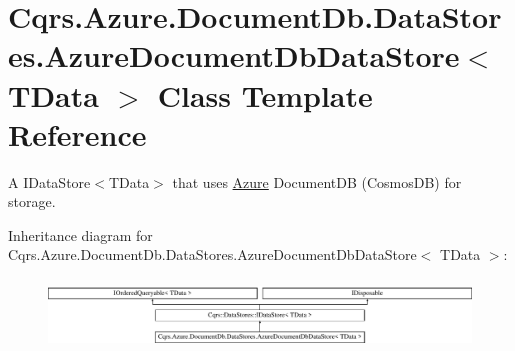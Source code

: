 \hypertarget{classCqrs_1_1Azure_1_1DocumentDb_1_1DataStores_1_1AzureDocumentDbDataStore}{}\section{Cqrs.\+Azure.\+Document\+Db.\+Data\+Stores.\+Azure\+Document\+Db\+Data\+Store$<$ T\+Data $>$ Class Template Reference}
\label{classCqrs_1_1Azure_1_1DocumentDb_1_1DataStores_1_1AzureDocumentDbDataStore}


A I\+Data\+Store$<$\+T\+Data$>$ that uses \hyperlink{namespaceCqrs_1_1Azure}{Azure} Document\+DB (Cosmos\+DB) for storage.  


Inheritance diagram for Cqrs.\+Azure.\+Document\+Db.\+Data\+Stores.\+Azure\+Document\+Db\+Data\+Store$<$ T\+Data $>$\+:\begin{figure}[H]
\begin{center}
\leavevmode
\includegraphics[height=1.870824cm]{classCqrs_1_1Azure_1_1DocumentDb_1_1DataStores_1_1AzureDocumentDbDataStore}
\end{center}
\end{figure}
